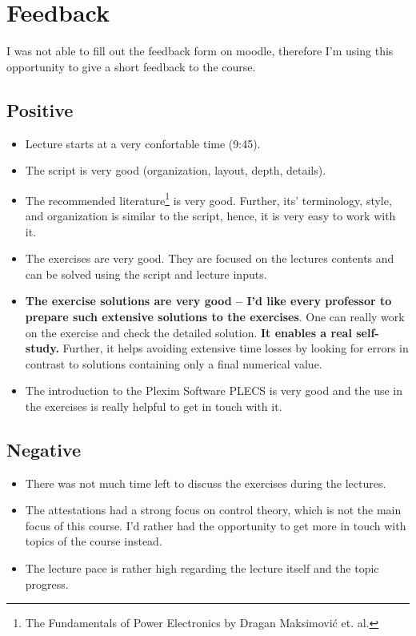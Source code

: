 \section{Feedback}

I was not able to fill out the feedback form on moodle, therefore I'm using
this opportunity to give a short feedback to the course.

\subsection{Positive}

\begin{itemize}
	\item Lecture starts at a very confortable time (9:45).
	\item The script is very good (organization, layout, depth, details).
	\item The recommended literature\footnote{The Fundamentals of Power
		Electronics by Dragan Maksimovi\'c et. al.} is very good.
		Further, its' terminology, style, and organization is similar
		to the script, hence, it is very easy to work with it.
	\item The exercises are very good. They are focused on the lectures
		contents and can be solved using the script and lecture inputs.
	\item \textbf{The exercise solutions are very good -- I'd like every
		professor to prepare such extensive solutions to the exercises}.
		One can really work on the exercise and check the detailed
		solution. \textbf{It enables a real self-study.} Further, it
		helps avoiding extensive time losses by looking for errors
		in contrast to solutions containing only a final numerical
		value.
	\item The introduction to the Plexim Software PLECS is very
		good and the use in the exercises is really helpful to get
		in touch with it.
\end{itemize}

\subsection{Negative}
\begin{itemize}
	\item There was not much time left to discuss the exercises during the lectures.
	\item The attestations had a strong focus on control theory, which is not
		the main focus of this course. I'd rather had the opportunity to
		get more in touch with topics of the course instead.
	\item The lecture pace is rather high regarding the lecture itself and the 
		topic progress.
\end{itemize}
